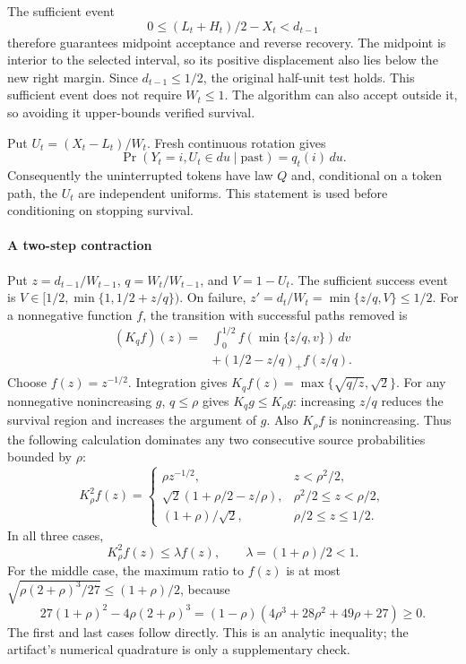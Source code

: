 The sufficient event
\begin{equation}
 0\le (L_t+H_t)/2-X_t<d_{t-1}
 \label{eq:safe-success}
\end{equation}
therefore guarantees midpoint acceptance and reverse recovery. The midpoint
is interior to the selected interval, so its positive displacement also lies
below the new right margin. Since $d_{t-1}\le1/2$, the original half-unit test
holds. This sufficient event does not require $W_t\le1$. The algorithm can
also accept outside it, so avoiding it upper-bounds verified survival.

Put $U_t=(X_t-L_t)/W_t$. Fresh continuous rotation gives
\[
 \Pr(Y_t=i,U_t\in du\mid\text{past})=q_t(i)\,du.
\]
Consequently the uninterrupted tokens have law $Q$ and, conditional on a token
path, the $U_t$ are independent uniforms. This statement is used before
conditioning on stopping survival.

\paragraph{A two-step contraction}
Put $z=d_{t-1}/W_{t-1}$, $q=W_t/W_{t-1}$, and $V=1-U_t$.
The sufficient success event is
$V\in[1/2,\min\{1,1/2+z/q\})$. On failure,
$z'=d_t/W_t=\min\{z/q,V\}\le1/2$. For a nonnegative function $f$, the transition
with successful paths removed is
\begin{equation}
 \begin{split}
 (K_qf)(z)={}&\int_0^{1/2}f(\min\{z/q,v\})\,dv\\
              &+(1/2-z/q)_+f(z/q).
 \end{split}
 \label{eq:killed-kernel}
\end{equation}
Choose $f(z)=z^{-1/2}$. Integration gives
$K_qf(z)=\max\{\sqrt{q/z},\sqrt2\}$. For any nonnegative nonincreasing $g$,
$q\le\rho$ gives $K_qg\le K_\rho g$: increasing $z/q$ reduces the survival
region and increases the argument of $g$. Also $K_\rho f$ is nonincreasing.
Thus the following calculation dominates any two consecutive source
probabilities bounded by $\rho$:
\begin{equation}
 K_\rho^2f(z)=
 \begin{cases}
 \rho z^{-1/2},&z<\rho^2/2,\\
 \sqrt2(1+\rho/2-z/\rho),&\rho^2/2\le z<\rho/2,\\
 (1+\rho)/\sqrt2,&\rho/2\le z\le1/2.
 \end{cases}
\end{equation}
In all three cases,
\begin{equation}
 K_\rho^2f(z)\le\lambda f(z),\qquad\lambda=(1+\rho)/2<1.
 \label{eq:two-step-contraction}
\end{equation}
For the middle case, the maximum ratio to $f(z)$ is at most
$\sqrt{\rho(2+\rho)^3/27}\le(1+\rho)/2$, because
\[
 27(1+\rho)^2-4\rho(2+\rho)^3
 =(1-\rho)(4\rho^3+28\rho^2+49\rho+27)\ge0.
\]
The first and last cases follow directly. This is an analytic inequality;
the artifact's numerical quadrature is only a supplementary check.

